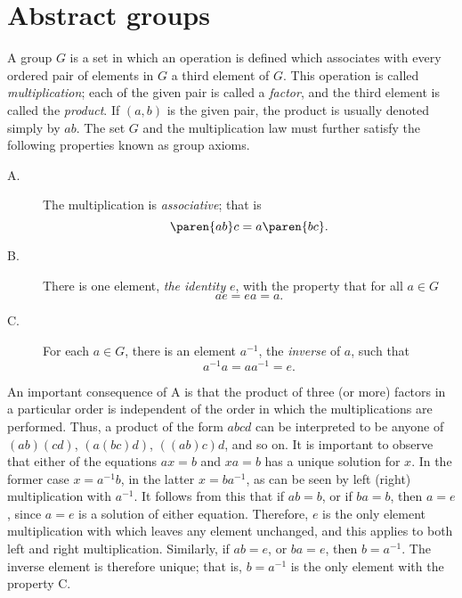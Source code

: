 \section{Abstract groups}

A group $G$ is a set in which an operation is defined which associates with every ordered pair of elements in $G$ a third element of $G$. This operation is called \emph{multiplication}; each of the given pair is called a \emph{factor}, and the third element is called the \emph{product}. If $(a, b)$ is the given pair, the product is usually denoted simply by $ab$. The set $G$ and the multiplication law must further satisfy the following properties known as group axioms.
\begin{description}
%
\item[A.] The multiplication is \emph{associative}; that is
\begin{equation}
  \paren{ab}c = a \paren{bc} . 
\end{equation}
%
\item[B.] There is one element, \emph{the identity} $e$, with the property that for all $a \in G$
\begin{equation}
  a e = ea = a.
\end{equation}
%
\item[C.] For each $a \in G$, there is an element $a^{-1}$, the \emph{inverse} of $a$, such that
\begin{equation}
  a^{-1} a = a a^{-1} = e.
\end{equation}
%
\end{description}

An important consequence of A is that the product of three (or more) factors in a particular order is independent of the order in which the multiplications are performed. Thus, a product of the form $abcd$ can be interpreted to be anyone of $(ab)(cd)$, $(a(bc)d)$, $((ab)c)d$, and so on. It is important to observe that either of the equations $ax = b$ and $xa = b$ has a unique solution for $x$. In the former case $x =a^{-1}b$, in the latter $x =ba^{-1}$, as can be seen by left (right) multiplication with $a^{-1}$. It follows from this that if $ab = b$, or if $ba = b$, then $a = e$, since $a = e$ is a solution of either equation. Therefore, $e$ is the only element multiplication with which leaves any element unchanged, and this applies to both left and right multiplication. Similarly, if $ab = e$, or $ba = e$, then $b =a^{-1}$.	The inverse element is therefore unique; that is, $b =a^{-1}$ is the only element with the property C. 

